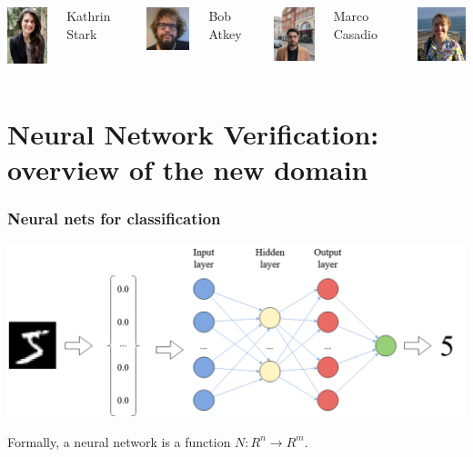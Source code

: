 \documentclass{beamer}
\begin{document}
\begin{frame}
\begin{columns}
      \includegraphics[width=1.5cm]{Images/Kathrin.jpg}
  \begin{block}{\footnotesize{Kathrin Stark}}
   \end{block}



     \includegraphics[width=1.6cm]{Images/Bob.jpeg}

          \begin{block}{\footnotesize{Bob Atkey}}
     \end{block}

       \includegraphics[width=1.5cm]{Images/Marco.jpg}
        \begin{block}{\footnotesize{Marco Casadio}}
     \end{block}
   \includegraphics[width=1.8cm]{Images/Katya3.jpg}
  \end{columns}
  \end{frame}




\section{Neural Network Verification: overview of the new domain}


\begin{frame}
\frametitle{Neural nets for classification}
\includegraphics[scale=.30]{Images/mnist_classification.png}

\begin{block}{Formally,}
 a neural network is a function $N : R^n \rightarrow R^m$.
\end{block}

\end{frame}
\end{document}
